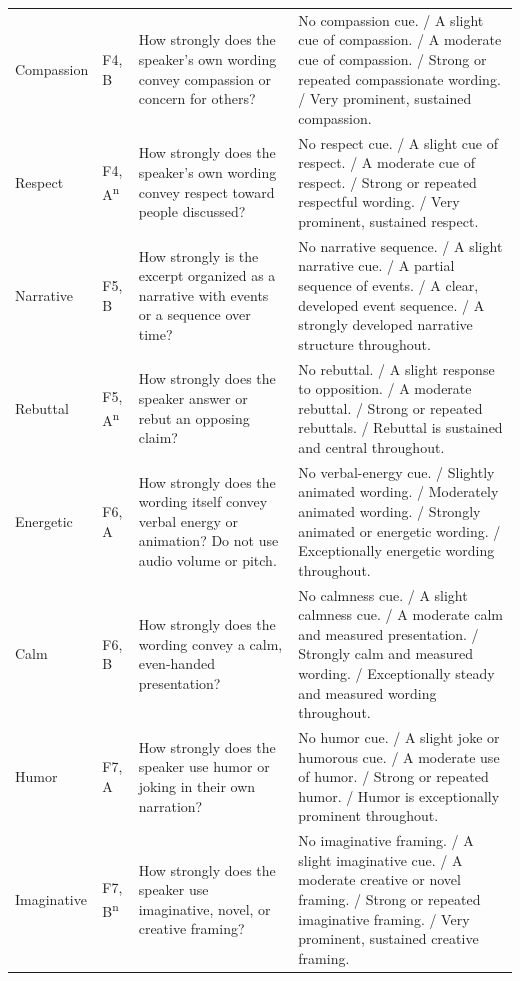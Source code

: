 \begin{longtable}{@{}p{2.2cm}p{1.0cm}p{4.7cm}p{7.0cm}@{}}
\addlinespace[2pt]
Compassion & F4, B & How strongly does the speaker's own wording convey compassion or concern for others? & No compassion cue. / A slight cue of compassion. / A moderate cue of compassion. / Strong or repeated compassionate wording. / Very prominent, sustained compassion. \\
\addlinespace[2pt]
Respect & F4, A\textsuperscript{n} & How strongly does the speaker's own wording convey respect toward people discussed? & No respect cue. / A slight cue of respect. / A moderate cue of respect. / Strong or repeated respectful wording. / Very prominent, sustained respect. \\
\addlinespace[2pt]
Narrative & F5, B & How strongly is the excerpt organized as a narrative with events or a sequence over time? & No narrative sequence. / A slight narrative cue. / A partial sequence of events. / A clear, developed event sequence. / A strongly developed narrative structure throughout. \\
\addlinespace[2pt]
Rebuttal & F5, A\textsuperscript{n} & How strongly does the speaker answer or rebut an opposing claim? & No rebuttal. / A slight response to opposition. / A moderate rebuttal. / Strong or repeated rebuttals. / Rebuttal is sustained and central throughout. \\
\addlinespace[2pt]
Energetic & F6, A & How strongly does the wording itself convey verbal energy or animation? Do not use audio volume or pitch. & No verbal-energy cue. / Slightly animated wording. / Moderately animated wording. / Strongly animated or energetic wording. / Exceptionally energetic wording throughout. \\
\addlinespace[2pt]
Calm & F6, B & How strongly does the wording convey a calm, even-handed presentation? & No calmness cue. / A slight calmness cue. / A moderate calm and measured presentation. / Strongly calm and measured wording. / Exceptionally steady and measured wording throughout. \\
\addlinespace[2pt]
Humor & F7, A & How strongly does the speaker use humor or joking in their own narration? & No humor cue. / A slight joke or humorous cue. / A moderate use of humor. / Strong or repeated humor. / Humor is exceptionally prominent throughout. \\
\addlinespace[2pt]
Imaginative & F7, B\textsuperscript{n} & How strongly does the speaker use imaginative, novel, or creative framing? & No imaginative framing. / A slight imaginative cue. / A moderate creative or novel framing. / Strong or repeated imaginative framing. / Very prominent, sustained creative framing. \\

\end{longtable}

